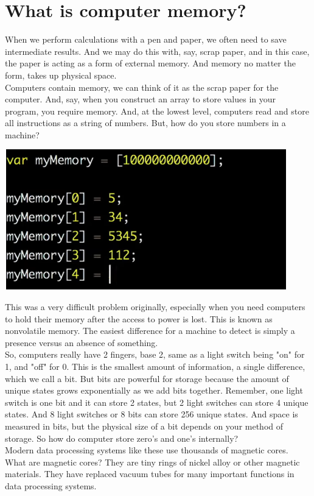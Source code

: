 \documentclass{report}
\begin{document}
\section{What is computer memory?}
When we perform calculations with a pen and paper, we often need to save intermediate results. And we may do this with, say, scrap paper, and in this case, the paper is acting as a form of external memory. And memory no matter the form, takes up physical space.\\
Computers contain memory, we can think of it as the scrap paper for the computer. And, say, when you construct an array to store values in your program, you require memory. And, at the lowest level, computers read and store all instructions as a string of numbers. But, how do you store numbers in a machine? 
\begin{center}
	\includegraphics[scale=1]{46.png}
\end{center}
This was a very difficult problem originally, especially when you need computers to hold their memory after the access to power is lost. This is known as nonvolatile memory. The easiest difference for a machine to detect is simply a presence versus an absence of something. \\
So, computers really have 2 fingers, base 2, same as a light switch being "on" for 1, and "off" for 0. This is the smallest amount of information, a single difference, which we call a bit. But bits are powerful for storage because the amount of unique states grows exponentially as we add bits together. Remember, one light switch is one bit and it can store 2 states, but 2 light switches can store 4 unique states. And 8 light switches or 8 bits can store 256 unique states. And space is measured in bits, but the physical size of a bit depends on your method of storage. So how do computer store zero's and one's internally?\\
Modern data processing systems like these use thousands of magnetic cores. What are magnetic cores? They are tiny rings of nickel alloy or other magnetic materials. They have replaced vacuum tubes for many important functions in data processing systems. 
\end{document}
